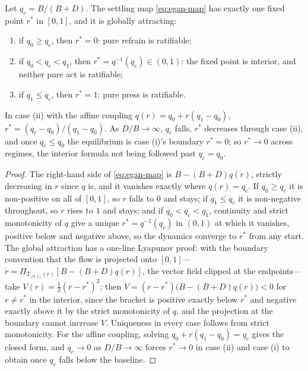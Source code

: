 \begin{theorem}
\label{thm:egan}
Let $q_c = B/(B+D)$. The settling map \eqref{eq:egan-map} has exactly one fixed point $r^{\ast}$ in $[0,1]$, and it is globally attracting:
\begin{enumerate}[label=(\roman*), leftmargin=2.4em, itemsep=0.1em]
\item if $q_0 \ge q_c$, then $r^{\ast} = 0$: pure refrain is ratifiable;
\item if $q_0 < q_c < q_1$, then $r^{\ast} = q^{-1}(q_c) \in (0,1)$: the fixed point is interior, and neither pure act is ratifiable;
\item if $q_1 \le q_c$, then $r^{\ast} = 1$: pure press is ratifiable.
\end{enumerate}
In case (ii) with the affine coupling $q(r) = q_0 + r(q_1 - q_0)$, $r^{\ast} = (q_c - q_0)/(q_1 - q_0)$. As $D/B \to \infty$, $q_c$ falls, $r^{\ast}$ decreases through case (ii), and once $q_c \le q_0$ the equilibrium is case (i)'s boundary $r^{\ast} = 0$; so $r^{\ast} \to 0$ across regimes, the interior formula not being followed past $q_c = q_0$.
\end{theorem}
\begin{proof}
The right-hand side of \eqref{eq:egan-map} is $B - (B+D)q(r)$, strictly decreasing in $r$ since $q$ is, and it vanishes exactly where $q(r) = q_c$. If $q_0 \ge q_c$ it is non-positive on all of $[0,1]$, so $r$ falls to $0$ and stays; if $q_1 \le q_c$ it is non-negative throughout, so $r$ rises to $1$ and stays; and if $q_0 < q_c < q_1$, continuity and strict monotonicity of $q$ give a unique $r^{\ast} = q^{-1}(q_c)$ in $(0,1)$ at which it vanishes, positive below and negative above, so the dynamics converge to $r^{\ast}$ from any start. The global attraction has a one-line Lyapunov proof: with the boundary convention that the flow is projected onto $[0,1]$---$\dot r = \Pi_{T_{[0,1]}(r)}[B - (B+D)q(r)]$, the vector field clipped at the endpoints---take $V(r) = \tfrac12 (r - r^{\ast})^{2}$; then $\dot V = (r - r^{\ast})\big(B - (B+D)q(r)\big) < 0$ for $r \ne r^{\ast}$ in the interior, since the bracket is positive exactly below $r^{\ast}$ and negative exactly above it by the strict monotonicity of $q$, and the projection at the boundary cannot increase $V$. Uniqueness in every case follows from strict monotonicity. For the affine coupling, solving $q_0 + r(q_1 - q_0) = q_c$ gives the closed form, and $q_c \to 0$ as $D/B \to \infty$ forces $r^{\ast} \to 0$ in case (ii) and case (i) to obtain once $q_c$ falls below the baseline.
\end{proof}
